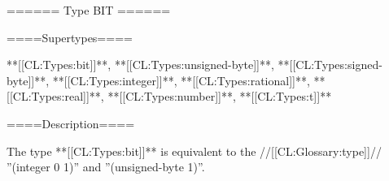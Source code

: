 ====== Type BIT ======

====Supertypes====

**[[CL:Types:bit]]**, **[[CL:Types:unsigned-byte]]**, **[[CL:Types:signed-byte]]**, **[[CL:Types:integer]]**, **[[CL:Types:rational]]**, **[[CL:Types:real]]**, **[[CL:Types:number]]**, **[[CL:Types:t]]**

====Description====

The type **[[CL:Types:bit]]** is equivalent to the //[[CL:Glossary:type]]// ''(integer 0 1)'' and ''(unsigned-byte 1)''.

